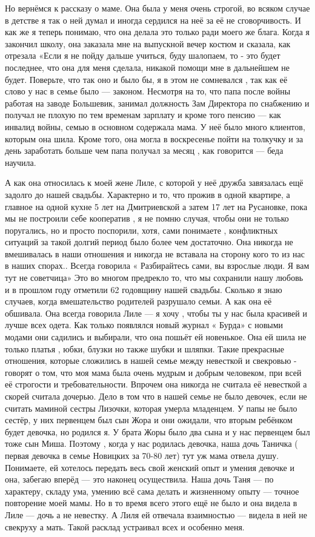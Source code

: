 Но вернёмся к рассказу о маме. Она была у меня очень строгой, во всяком случае
в детстве я так о ней думал и иногда сердился на неё за её не сговорчивость. И
как же я теперь понимаю, что она  делала это только ради моего же блага.  Когда
я закончил школу, она заказала мне на выпускной вечер костюм и сказала, как
отрезала «Если я не пойду дальше учиться, буду шалопаем, то - это  будет
последнее, что она для меня сделала, никакой помощи мне в дальнейшем  не будет.
Поверьте, что так оно и было бы, я в этом не сомневался , так как её слово у
нас в семье было — законом. Несмотря на то, что папа после войны работая на
заводе Большевик, занимал должность Зам Директора по снабжению  и получал не
плохую по тем временам  зарплату и кроме того пенсию — как инвалид войны, семью
в основном содержала мама.  У неё было много клиентов, которым она шила. Кроме
того, она могла в воскресенье пойти на толкучку и за день заработать больше
чем папа  получал за месяц , как говорится — беда научила.

А как она относилась к моей жене Лиле, с которой у неё дружба завязалась ещё
задолго до нашей свадьбы. Характерно и то, что прожив в одной квартире, а
главное  на одной кухне 5 лет на Дмитриевской а затем 17 лет на Русановке, пока
мы не построили себе кооператив , я не помню случая, чтобы они не только
поругались, но и  просто поспорили, хотя, сами понимаете , конфликтных ситуаций
за такой долгий период было более чем  достаточно. Она  никогда не вмешивалась
в наши отношения и никогда не вставала на сторону кого то из нас в наших
спорах..  Всегда говорила « Разбирайтесь сами,  вы взрослые люди. Я вам тут не
советчица»  Это во многом предрекло то, что мы сохранили нашу любовь и в
прошлом году отметили 62 годовщину нашей свадьбы. Сколько я знаю случаев, когда
вмешательство  родителей  разрушало семьи.  А как она её обшивала. Она всегда
говорила Лиле — я хочу , чтобы ты у нас была красивей и лучше  всех одета. Как
только появлялся новый журнал « Бурда» с новыми модами они садились и выбирали,
что она пошьёт  ей новенькое.  Она ей шила не только платья , юбки, блузки  но
также  шубки и шляпки.  Такие прекрасные отношения, которые сложились в нашей
семье   между невесткой и свекровью  - говорят о том, что моя мама  была  очень
мудрым и добрым человеком, при всей её строгости и требовательности. Впрочем
она никогда не считала её невесткой а скорей считала дочерью. Дело в том что в
нашей семье не было девочек, если не считать маминой сестры Лизочки, которая
умерла младенцем. У папы не было сестёр, у них первенцем  был сын  Жора и они
ожидали, что   вторым ребёнком  будет  девочка, но родился я. У брата Жоры было
два сына и у нас первенцем был  тоже сын Миша. Поэтому , когда у нас  родилась
девочка, наша дочь Таничка ( первая девочка  в семье Новицких  за  70-80 лет)
тут уж мама отвела душу. Понимаете, ей хотелось передать весь свой женский опыт
и умения  девочке  и она, забегаю вперёд — это наконец осуществила. Наша дочь
Таня — по характеру, складу ума,  умению всё сама делать и  жизненному опыту —
точное повторение моей мамы. Но в то время всего этого ещё  не было и она
видела в Лиле — дочь а не невестку. А Лиля ей отвечала взаимностью — видела в
ней не свекруху а мать.  Такой расклад устраивал всех и особенно меня.

